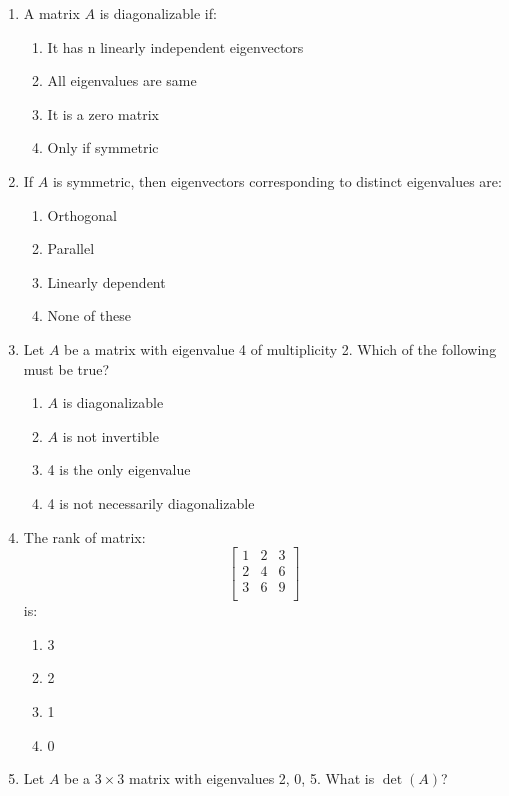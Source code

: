 \begin{enumerate}
\item A matrix \( A \) is diagonalizable if:

\begin{enumerate}[label=(\alph*)]
\item It has n linearly independent eigenvectors 
\item All eigenvalues are same 
\item It is a zero matrix 
\item Only if symmetric
\end{enumerate}

\item If \( A \) is symmetric, then eigenvectors corresponding to distinct eigenvalues are:

\begin{enumerate}[label=(\alph*)]
\item Orthogonal 
\item Parallel 
\item Linearly dependent 
\item None of these
\end{enumerate}

\item Let \( A \) be a matrix with eigenvalue 4 of multiplicity 2. Which of the following must be true?

\begin{enumerate}[label=(\alph*)]
\item \( A \) is diagonalizable 
\item \( A \) is not invertible 
\item 4 is the only eigenvalue 
\item 4 is not necessarily diagonalizable
\end{enumerate}

\item The rank of matrix:
\[
\begin{bmatrix}
1 & 2 & 3 \\
2 & 4 & 6 \\
3 & 6 & 9 \\
\end{bmatrix}
\] is:

\begin{enumerate}[label=(\alph*)]
\item 3 \quad \item 2 \quad \item 1 \quad \item 0
\end{enumerate}

\newpage
\item Let \( A \) be a \( 3 \times 3 \) matrix with eigenvalues 2, 0, 5. What is \( \det(A) \)?


\end{enumerate}
